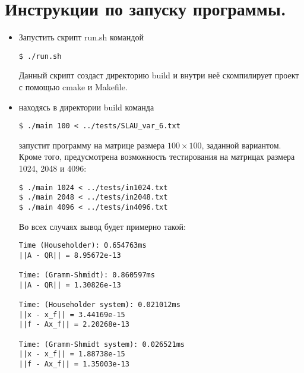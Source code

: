 \documentclass[a4paper,12pt,titlepage,final]{article}
\begin{document}
\section{Инструкции по запуску программы.}
\begin{itemize}
    \item Запустить скрипт run.sh командой 
\begin{lstlisting}
$ ./run.sh 
\end{lstlisting} 
Данный скрипт создаст директорию build и внутри неё скомпилирует проект с помощью cmake и Makefile. 
    \item находясь в директории build команда 
\begin{lstlisting}
$ ./main 100 < ../tests/SLAU_var_6.txt
\end{lstlisting} 
    запустит программу на матрице размера $100 \times 100$, заданной вариантом. Кроме того, предусмотрена возможность тестирования на матрицах размера 1024, 2048 и 4096:
\begin{lstlisting}
$ ./main 1024 < ../tests/in1024.txt
$ ./main 2048 < ../tests/in2048.txt
$ ./main 4096 < ../tests/in4096.txt
\end{lstlisting} 
Во всех случаях вывод будет примерно такой:
\begin{lstlisting}
Time (Householder): 0.654763ms
||A - QR|| = 8.95672e-13

Time: (Gramm-Shmidt): 0.860597ms
||A - QR|| = 1.30826e-13

Time: (Householder system): 0.021012ms
||x - x_f|| = 3.44169e-15
||f - Ax_f|| = 2.20268e-13

Time: (Gramm-Shmidt system): 0.026521ms
||x - x_f|| = 1.88738e-15
||f - Ax_f|| = 1.35003e-13
\end{lstlisting} 
\end{itemize}
\end{document}
